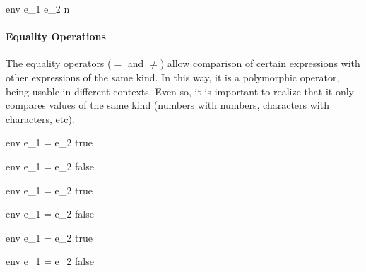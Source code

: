 \documentclass{article}
\begin{document}
    {\mbox{env} \vdash e_1 \div e_2 \Downarrow n}

\paragraph{Equality Operations}
The equality operators ($=$ and $\neq$) allow comparison of certain expressions with other expressions of the same kind.
In this way, it is a polymorphic operator, being usable in different contexts.
Even so, it is important to realize that it only compares values of the same kind (numbers with numbers, characters with characters, etc).

\medskip

    {\mbox{env} \vdash e_1 = e_2 \Downarrow true}

    {\mbox{env} \vdash e_1 = e_2 \Downarrow false}

\medskip

    {\mbox{env} \vdash e_1 = e_2 \Downarrow true}

    {\mbox{env} \vdash e_1 = e_2 \Downarrow false}

\medskip

    {\mbox{env} \vdash e_1 = e_2 \Downarrow true}

    {\mbox{env} \vdash e_1 = e_2 \Downarrow false}

\medskip
\end{document}
